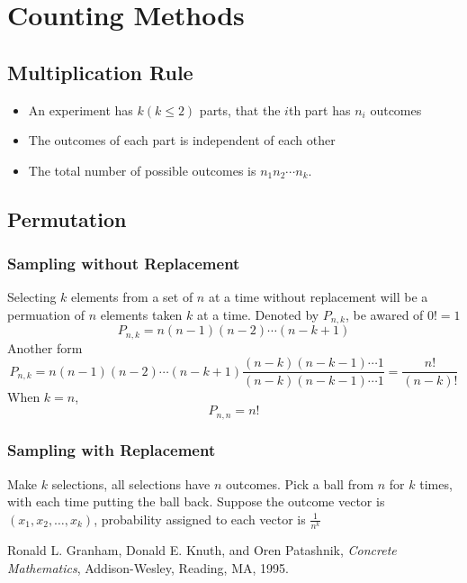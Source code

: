 \documentclass{book}
\begin{document}
	\section{Counting Methods}
		\subsection{Multiplication Rule}
		\begin{itemize}
			\item An experiment has $k(k \leq 2)$ parts, that the $i$th part has $n_i$ outcomes
			\item The outcomes of each part is independent of each other 
			\item The total number of possible outcomes is $n_1n_2\cdots n_k$.  
		\end{itemize}

		\subsection{Permutation}
			\subsubsection{Sampling without Replacement}
			Selecting $k$ elements from a set of $n$ at a time without 
			replacement will be a permuation of $n$ elements taken $k$ at 
			a time.  Denoted by $P_{n, k}$, be awared of $0! = 1$
			\[
				P_{n, k} = n(n-1)(n-2)\cdots(n-k+1) 
			\]
			Another form
			\[
				P_{n, k} = n(n-1)(n-2)\cdots(n-k+1)\frac{(n-k)(n-k-1)\cdots1}{(n-k)(n-k-1)\cdots1}
					 = \frac{n!}{(n-k)!}
			\]
			When $ k=n $,
			\[
				P_{n, n} = n! 
			\]

			\subsubsection{Sampling with Replacement}
			Make $k$ selections, all selections have $n$ outcomes.  
			Pick a ball from $n$ for $k$ times, with each time putting the ball back.  
			Suppose the outcome vector is $(x_1, x_2,\ldots,x_k)$, 
			probability assigned to each vector is $\frac{1}{n^k}$



\begin{thebibliography}{9}
		Ronald L.   Granham, Donald E.  Knuth, and Oren Patashnik,
		\textit{Concrete Mathematics},
		Addison-Wesley, Reading, MA, 1995.
	\end{thebibliography}
\end{document}
